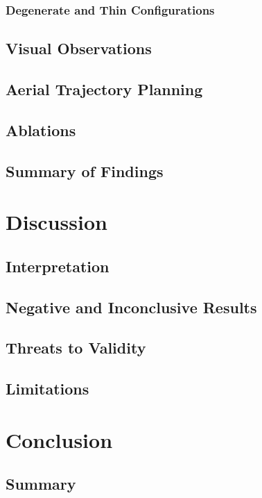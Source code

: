 \documentclass[headsepline,footsepline,footinclude=false,oneside,fontsize=11pt,paper=a4,listof=totoc,bibliography=totoc]{scrbook}
\theoremstyle{definition}
\theoremstyle{plain}
\theoremstyle{remark}
\begin{document}
\subsection{Degenerate and Thin Configurations}\label{sec:res:constraints:degenerate}
\section{Visual Observations}\label{sec:res:visual}
\section{Aerial Trajectory Planning}\label{sec:res:uav}
\section{Ablations}\label{sec:res:ablations}
\section{Summary of Findings}\label{sec:res:summary}

\chapter{Discussion}\label{ch:discussion}
\section{Interpretation}\label{sec:disc:interpretation}
\section{Negative and Inconclusive Results}\label{sec:disc:negative}
\section{Threats to Validity}\label{sec:disc:threats}
\section{Limitations}\label{sec:disc:limitations}

\chapter{Conclusion}\label{ch:conclusion}
\section{Summary}\label{sec:conc:summary}
\end{document}
